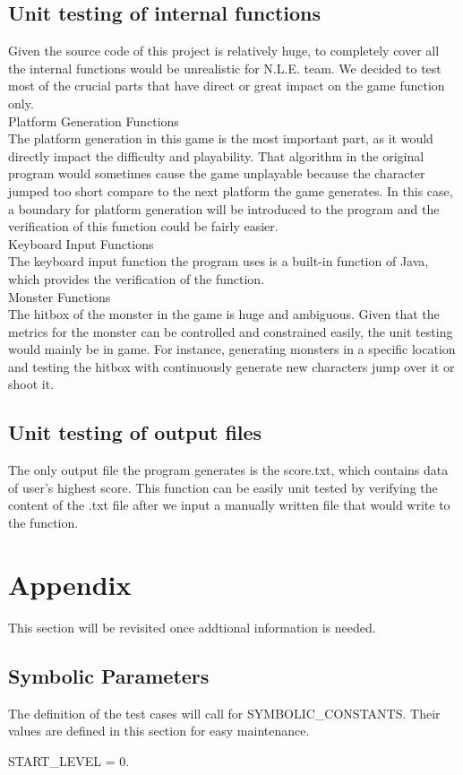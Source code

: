 \documentclass[12pt, titlepage]{article}
\begin{document}
\subsection{Unit testing of internal functions}
Given the source code of this project is relatively huge, to completely cover all the internal functions would be unrealistic for N.L.E. team. We decided to test most of the crucial parts that have direct or great impact on the game function only.\\
Platform Generation Functions\\
The platform generation in this game is the most important part, as it would directly impact the difficulty and playability. That algorithm in the original program would sometimes cause the game unplayable because the character jumped too short compare to the next platform the game generates. In this case, a boundary for platform generation will be introduced to the program and the verification of this function could be fairly easier.\\
Keyboard Input Functions\\
The keyboard input function the program uses is a built-in function of Java, which provides the verification of the function.\\
Monster Functions\\
The hitbox of the monster in the game is huge and ambiguous. Given that the metrics for the monster can be controlled and  constrained easily, the unit testing would mainly be in game. For instance, generating monsters in a specific location and testing the hitbox with continuously generate new characters jump over it or shoot it.\\

\subsection{Unit testing of output files}		
The only output file the program generates is the score.txt, which contains data of user's highest score. This function can be easily unit tested by verifying the content of the .txt file after we input a manually written file that would write to the function.




\newpage

\section{Appendix}

This section will be revisited once addtional information is needed.

\subsection{Symbolic Parameters}

The definition of the test cases will call for SYMBOLIC\_CONSTANTS.
Their values are defined in this section for easy maintenance.

START\_LEVEL = 0.
\end{document}
